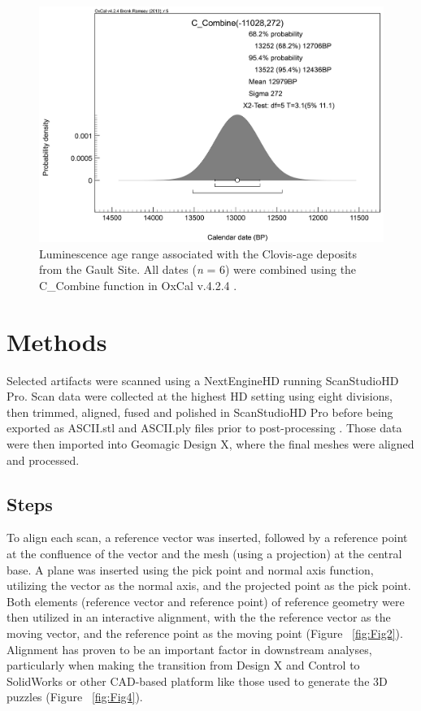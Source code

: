 \documentclass[preprint,12pt]{elsarticle}
\begin{document}
\begin{figure}[ht]\centering
\includegraphics[width=\linewidth]{Fig3}
\caption{Luminescence age range associated with the Clovis-age deposits from the Gault Site. All dates (\textit{n} = 6) were combined using the C\_Combine function in OxCal v.4.2.4 \citep{RN308}.}
\label{fig:Fig3}
\end{figure}


\section{Methods}

Selected artifacts were scanned using a NextEngineHD running ScanStudioHD Pro. Scan data were collected at the highest HD setting using eight divisions, then trimmed, aligned, fused and polished in ScanStudioHD Pro before being exported as ASCII.stl and ASCII.ply files prior to post-processing \cite{Galeazzi:1,Weyrich:1}. Those data were then imported into Geomagic Design X, where the final meshes were aligned and processed.

\subsection{Steps}

To align each scan, a reference vector was inserted, followed by a reference point at the confluence of the vector and the mesh (using a projection) at the central base. A plane was inserted using the pick point and normal axis function, utilizing the vector as the normal axis, and the projected point as the pick point. Both elements (reference vector and reference point) of reference geometry were then utilized in an interactive alignment, with the the reference vector as the moving vector, and the reference point as the moving point (Figure ~\ref{fig:Fig2}). Alignment has proven to be an important factor in downstream analyses, particularly when making the transition from Design X and Control to SolidWorks or other CAD-based platform \cite{Selden:5} like those used to generate the 3D puzzles (Figure ~\ref{fig:Fig4}). 
\end{document}
